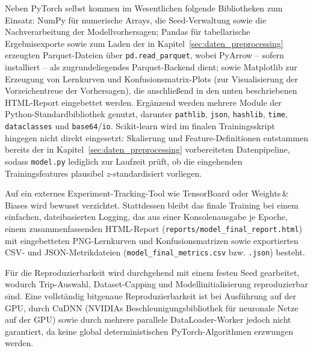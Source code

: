 Neben PyTorch selbst kommen im Wesentlichen folgende Bibliotheken zum Einsatz: NumPy für numerische Arrays, die Seed-Verwaltung sowie die Nachverarbeitung der Modellvorhersagen; Pandas für tabellarische Ergebnisexporte sowie zum Laden der in Kapitel~\ref{sec:daten_preprocessing} erzeugten Parquet-Dateien über \texttt{pd.read\_parquet}, wobei PyArrow -- sofern installiert -- als zugrundeliegendes Parquet-Backend dient; sowie Matplotlib zur Erzeugung von Lernkurven und Konfusionsmatrix-Plots (zur Visualisierung der Vorzeichentreue der Vorhersagen), die anschließend in den unten beschriebenen HTML-Report eingebettet werden. Ergänzend werden mehrere Module der Python-Standardbibliothek genutzt, darunter \texttt{pathlib}, \texttt{json}, \texttt{hashlib}, \texttt{time}, \texttt{dataclasses} und \texttt{base64}/\texttt{io}. Scikit-learn wird im finalen Trainingsskript hingegen nicht direkt eingesetzt: Skalierung und Feature-Definitionen entstammen bereits der in Kapitel~\ref{sec:daten_preprocessing} vorbereiteten Datenpipeline, sodass \texttt{model.py} lediglich zur Laufzeit prüft, ob die eingehenden Trainingsfeatures plausibel $z$-standardisiert vorliegen.

Auf ein externes Experiment-Tracking-Tool wie TensorBoard oder Weights\,\&\,Biases wird bewusst verzichtet. Stattdessen bleibt das finale Training bei einem einfachen, dateibasierten Logging, das aus einer Konsolenausgabe je Epoche, einem zusammenfassenden HTML-Report (\texttt{reports/model\_final\_report.html}) mit eingebetteten PNG-Lernkurven und Konfusionsmatrizen sowie exportierten CSV- und JSON-Metrikdateien (\texttt{model\_final\_metrics.csv} bzw. \texttt{.json}) besteht.

Für die Reproduzierbarkeit wird durchgehend mit einem festen Seed gearbeitet, wodurch Trip-Auswahl, Dataset-Capping und Modellinitialisierung reproduzierbar sind. Eine vollständig bitgenaue Reproduzierbarkeit ist bei Ausführung auf der \gls{GPU}, durch CuDNN (NVIDIAs Beschleunigungsbibliothek für neuronale Netze auf der GPU) sowie durch mehrere parallele DataLoader-Worker jedoch nicht garantiert, da keine global deterministischen PyTorch-Algorithmen erzwungen werden.

